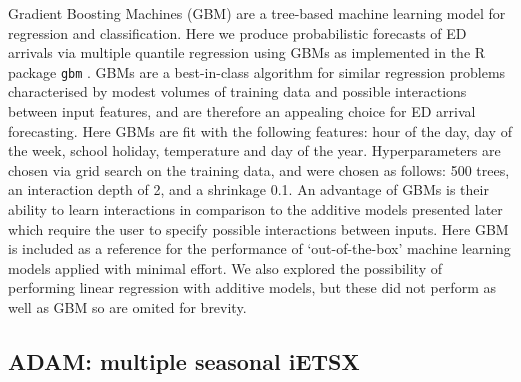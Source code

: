 \documentclass[]{elsarticle} %
\begin{document}
Gradient Boosting Machines (GBM) are a tree-based machine learning model
for regression and classification. Here we produce probabilistic
forecasts of ED arrivals via multiple quantile regression using GBMs as
implemented in the R package \texttt{gbm} \citep{Greenwell2020}. GBMs are a
best-in-class algorithm for similar regression problems characterised by
modest volumes of training data and possible interactions between input
features, and are therefore an appealing choice for ED arrival
forecasting. Here GBMs are fit with the following features: hour of the
day, day of the week, school holiday, temperature and day of the year.
Hyperparameters are chosen via grid search on the training data, and
were chosen as follows: 500 trees, an interaction depth of 2, and a
shrinkage 0.1. An advantage of GBMs is their ability to learn
interactions in comparison to the additive models presented later which
require the user to specify possible interactions between inputs. Here
GBM is included as a reference for the performance of `out-of-the-box'
machine learning models applied with minimal effort. We also explored
the possibility of performing linear regression with additive models,
but these did not perform as well as GBM so are omited for brevity.

\hypertarget{adam-multiple-seasonal-ietsx}{%
\subsection{ADAM: multiple seasonal iETSX}\label{adam-multiple-seasonal-ietsx}}
\end{document}
